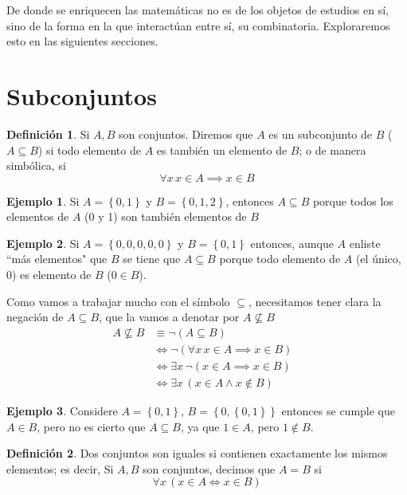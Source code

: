 \documentclass{book}
\newcommand{\set}[1]{\left\lbrace #1 \right\rbrace }
\theoremstyle{definition}
\newtheorem{df}{Definición}[chapter]
\newtheorem*{ejm}{Ejemplo}
\begin{document}
De donde se enriquecen las matemáticas no es de los objetos de estudios en sí, sino de la forma en la que interactúan entre sí, su combinatoria.
Exploraremos esto en las siguientes secciones.
\section{Subconjuntos}
\begin{df}
	Si $A,B$ son conjuntos. Diremos que $A$ es un subconjunto de $B$ ($A\subseteq B$) si todo elemento de $A$ es también un elemento de $B$; o de manera simbólica, si
	\[\forall x\, x\in A \implies x \in B \]
\end{df}

\begin{ejm}
	Si $A=\set{0,1}$ y $B=\set{0,1,2}$, entonces $A\subseteq B$ porque todos los elementos de $A$ (0 y 1) son también elementos de $B$
\end{ejm}

\begin{ejm}
	Si $A=\set{0,0,0,0,0}$ y $B=\set{0,1}$ entonces, aunque $A$ enliste ``más elementos" que $B$ se tiene que $A\subseteq B$ porque todo elemento de $A$ (el único, $0$) es elemento de $B$ ($0 \in B$). 
\end{ejm}

Como vamos a trabajar mucho con el símbolo $\subseteq$, necesitamos tener clara la negación de $A\subseteq B$, que la vamos a denotar por $A \not \subseteq B$
\begin{align*}
	A \not \subseteq B &\equiv \neg (A \subseteq B) & \\
	&\iff \neg (\forall x\, x \in A \implies x \in B)\\
	&\iff \exists x\, \neg (x \in A \implies x \in B)\\
	&\iff \exists x\, \left( x\in A \wedge x \notin B \right)
\end{align*}

\begin{ejm}
	Considere $A = \set{0,1}$, $B=\set{0,\set{0,1}}$ entonces se cumple que $A\in B$, pero no es cierto que $A\subseteq B$, ya que $1\in A$, pero $1 \notin B$.
\end{ejm}

\begin{df}
	Dos conjuntos son iguales si contienen exactamente los mismos elementos; es decir,
	Si $A,B$ son conjuntos, decimos que $A=B$ si \[\forall x \, \left(x\in A \iff x \in B \right) \]
\end{df}
\end{document}
